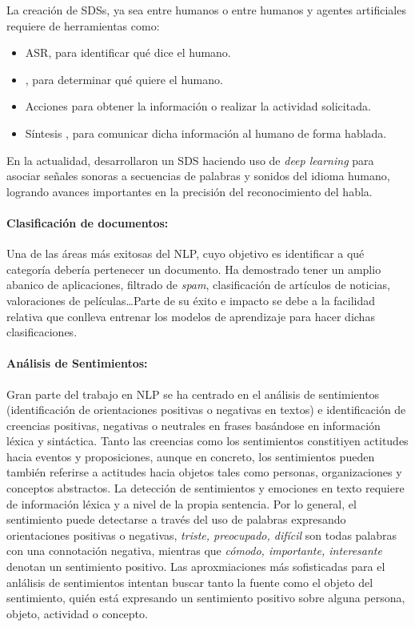 La creación de \acp{SDS}, ya sea entre humanos o entre humanos y agentes
artificiales requiere de herramientas como:
\begin{itemize}
\item \ac{ASR}, para identificar qué dice el humano.
\item {}, para
  determinar qué quiere el humano.
\item Acciones para obtener la información o realizar la actividad
  solicitada.
\item Síntesis , para comunicar dicha información al humano de forma hablada.
\end{itemize} En la actualidad, \citet{microsoft:sds} desarrollaron un \ac{SDS}
haciendo uso de \emph{deep learning} para asociar señales sonoras a secuencias
de palabras y sonidos del idioma humano, logrando avances importantes en la
precisión del reconocimiento del habla.

\paragraph{Clasificación de documentos:} Una de las áreas más exitosas del
\ac{NLP}, cuyo objetivo es identificar a qué categoría debería pertenecer un
documento. Ha demostrado tener un amplio abanico de aplicaciones, \eg filtrado
de \emph{spam}, clasificación de artículos de noticias, valoraciones de
películas\dots Parte de su éxito e impacto se debe a la facilidad relativa que
conlleva entrenar los modelos de aprendizaje para hacer dichas clasificaciones.

\paragraph{Análisis de Sentimientos:} Gran parte del trabajo en \ac{NLP} se ha
centrado en el análisis de sentimientos (identificación de orientaciones
positivas o negativas en textos) e identificación de creencias positivas,
negativas o neutrales en frases basándose en información léxica y
sintáctica. Tanto las creencias como los sentimientos constitiyen actitudes
hacia eventos y proposiciones, aunque en concreto, los sentimientos pueden
también referirse a actitudes hacia objetos tales como personas, organizaciones
y conceptos abstractos. La detección de sentimientos y emociones en texto
requiere de información léxica y a nivel de la propia sentencia. Por lo general,
el sentimiento puede detectarse a través del uso de palabras expresando
orientaciones positivas o negativas, \eg \emph{triste, preocupado, difícil} son
todas palabras con una connotación negativa, mientras que \emph{cómodo,
  importante, interesante} denotan un sentimiento positivo. Las aproxmiaciones
más sofisticadas para el anlálisis de sentimientos intentan buscar tanto la
fuente como el objeto del sentimiento, \eg quién está expresando un sentimiento
positivo sobre alguna persona, objeto, actividad o concepto.

